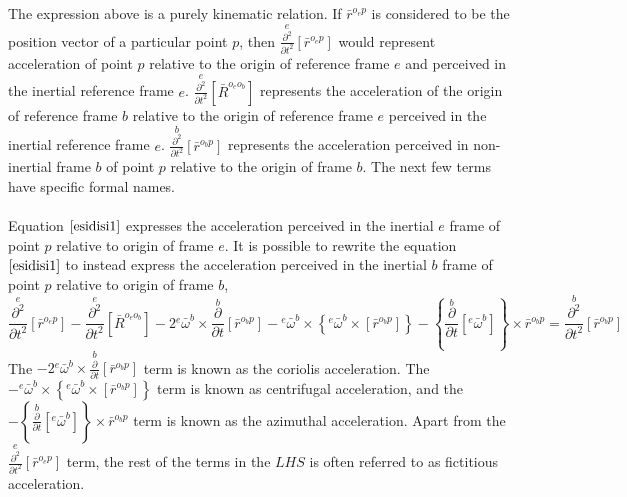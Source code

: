 \documentclass[a4paper, 12pt]{report}
\begin{document}
\begin{center}
The expression above is a purely kinematic relation. If $\displaystyle \bar{r}^{o_{e}p}$ is considered to be the position vector of a particular point $p$, then $\displaystyle \overset{e}{\frac{\partial^{2}}{\partial t^{2}}}[\bar{r}^{o_{e}p}]$ would represent acceleration of point $p$ relative to the origin of reference frame $e$ and perceived in the inertial reference frame $e$. $\displaystyle \overset{e}{\frac{\partial^{2}}{\partial t^{2}}}[\bar{R}^{o_{e}o_{b}}]$ represents the acceleration of the origin of reference frame $b$ relative to the origin of reference frame $e$ perceived in the inertial reference frame $e$. $\displaystyle \overset{b}{\frac{\partial^{2}}{\partial t^{2}}}[\bar{r}^{o_{b}p}]$ represents the acceleration perceived in non-inertial frame $b$ of point $p$ relative to the origin of frame $b$. The next few terms have specific formal names.
\\~\\Equation $\ref{esidisi1}$ expresses the acceleration perceived in the inertial $e$ frame of point $p$ relative to origin of frame $e$. It is possible to rewrite the equation $\ref{esidisi1}$ to instead express the acceleration perceived in the inertial $b$ frame of point $p$ relative to origin of frame $b$,
\begin{equation}\overset{e}{\frac{\partial^{2}}{\partial t^{2}}}[\bar{r}^{o_{e}p}]  -  \overset{e}{\frac{\partial^{2}}{\partial t^{2}}}[\bar{R}^{o_{e}o_{b}}]  -  2{}^{e}\bar{\omega}^{b}\times\overset{b}{\frac{\partial}{\partial t}}[\bar{r}^{o_{b}p}]    -   {}^{e}\bar{\omega}^{b}\times\left\{{}^{e}\bar{\omega}^{b}\times\left[\bar{r}^{o_{b}p}\right]\right\}  -    \left\{\overset{b}{\frac{\partial}{\partial t}}[{}^{e}\bar{\omega}^{b}]\right\}\times\bar{r}^{o_{b}p} =  \overset{b}{\frac{\partial^{2}}{\partial t^{2}}}[\bar{r}^{o_{b}p}]    \label{esidisi2}\end{equation}
The $\displaystyle   -  2{}^{e}\bar{\omega}^{b}\times\overset{b}{\frac{\partial}{\partial t}}[\bar{r}^{o_{b}p}]$ term is known as the coriolis acceleration. The $\displaystyle     -   {}^{e}\bar{\omega}^{b}\times\left\{{}^{e}\bar{\omega}^{b}\times\left[\bar{r}^{o_{b}p}\right]\right\}$ term is known as centrifugal acceleration, and the $\displaystyle   -    \left\{\overset{b}{\frac{\partial}{\partial t}}[{}^{e}\bar{\omega}^{b}]\right\}\times\bar{r}^{o_{b}p}$ term is known as the azimuthal acceleration. Apart from the $\displaystyle \overset{e}{\frac{\partial^{2}}{\partial t^{2}}}[\bar{r}^{o_{e}p}]$ term, the rest of the terms in the $LHS$ is often referred to as fictitious acceleration.

\end{center}
\end{document}
